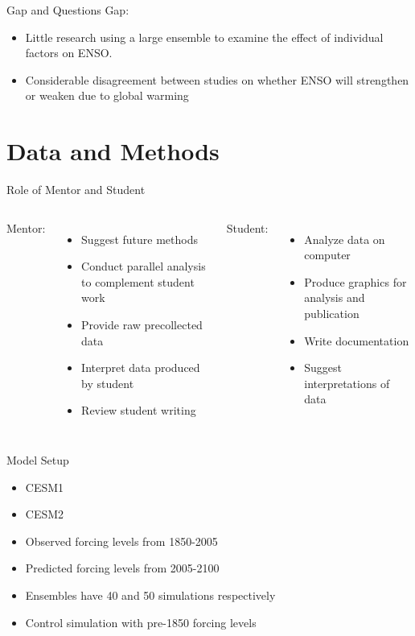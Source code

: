 \documentclass{beamer}
\begin{document}
\begin{frame}{Gap and Questions}
  Gap:
  \begin{itemize}
  \item Little research using a large ensemble to examine the effect of individual factors on ENSO.
  \item Considerable disagreement between studies on whether ENSO will strengthen or weaken due to global warming
  \end{itemize}
\end{frame}

\section{Data and Methods}

\begin{frame}{Role of Mentor and Student}
  \begin{columns}[t]
    Mentor:
    \begin{itemize}
    \item Suggest future methods
    \item Conduct parallel analysis to complement student work
    \item Provide raw precollected data
    \item Interpret data produced by student
    \item Review student writing
    \end{itemize}
    Student:
    \begin{itemize}
    \item Analyze data on computer
    \item Produce graphics for analysis and publication
    \item Write documentation
    \item Suggest interpretations of data
    \end{itemize}
  \end{columns}

\end{frame}

\begin{frame}{Model Setup}
  \begin{itemize}
  \item CESM1 \citep{kay2015community}
  \item CESM2 \citep{danabasoglu2020community}
  \item Observed forcing levels from 1850-2005
  \item Predicted forcing levels from 2005-2100
  \item Ensembles have 40 and 50 simulations respectively
  \item Control simulation with pre-1850 forcing levels
  \end{itemize}
\end{frame}
\end{document}
